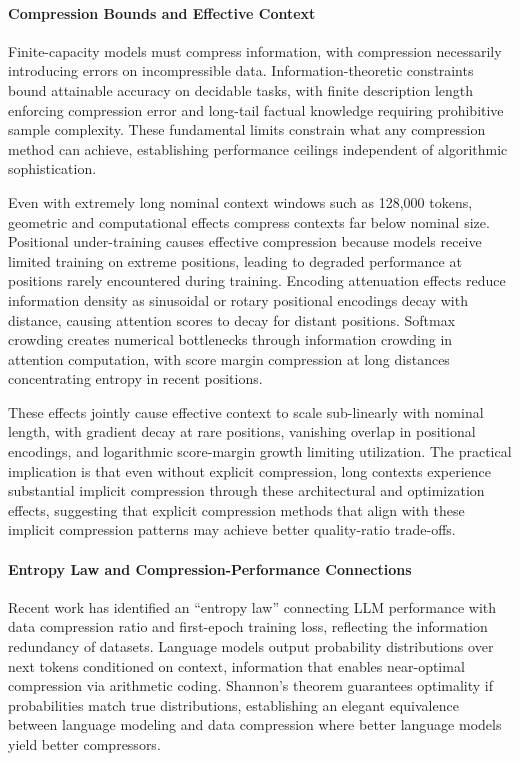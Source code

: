 \paragraph{Compression Bounds and Effective Context}

Finite-capacity models must compress information, with compression necessarily introducing errors on incompressible data. Information-theoretic constraints bound attainable accuracy on decidable tasks, with finite description length enforcing compression error and long-tail factual knowledge requiring prohibitive sample complexity. These fundamental limits constrain what any compression method can achieve, establishing performance ceilings independent of algorithmic sophistication.

Even with extremely long nominal context windows such as 128,000 tokens, geometric and computational effects compress contexts far below nominal size. Positional under-training causes effective compression because models receive limited training on extreme positions, leading to degraded performance at positions rarely encountered during training. Encoding attenuation effects reduce information density as sinusoidal or rotary positional encodings decay with distance, causing attention scores to decay for distant positions. Softmax crowding creates numerical bottlenecks through information crowding in attention computation, with score margin compression at long distances concentrating entropy in recent positions.

These effects jointly cause effective context to scale sub-linearly with nominal length, with gradient decay at rare positions, vanishing overlap in positional encodings, and logarithmic score-margin growth limiting utilization. The practical implication is that even without explicit compression, long contexts experience substantial implicit compression through these architectural and optimization effects, suggesting that explicit compression methods that align with these implicit compression patterns may achieve better quality-ratio trade-offs.

\paragraph{Entropy Law and Compression-Performance Connections}

Recent work has identified an ``entropy law'' connecting LLM performance with data compression ratio and first-epoch training loss, reflecting the information redundancy of datasets. Language models output probability distributions over next tokens conditioned on context, information that enables near-optimal compression via arithmetic coding. Shannon's theorem guarantees optimality if probabilities match true distributions, establishing an elegant equivalence between language modeling and data compression where better language models yield better compressors.

